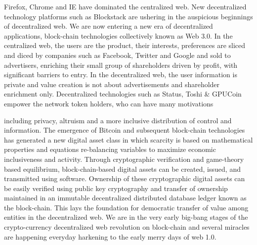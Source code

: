 \documentclass{article}
\begin{document}
Firefox, Chrome and IE have dominated the centralized web. New decentralized technology platforms such as Blockstack are ushering in the auspicious beginnings of decentralized web. 
We are now entering a new era of decentralized applications, block-chain technologies collectively known as Web 3.0. In the centralized web, the users are the product, their interests, preferences are sliced and diced by companies such as Facebook, Twitter and Google and sold to advertisers, enriching their small group of shareholders driven by profit, with significant barriers to entry. In the
decentralized web, the user information is private and value creation is not about advertisements and shareholder enrichment only. Decentralized
technologies such as Status, Toshi \& GPUCoin empower the network token holders, who can have many motivations 

 including privacy, altruism and a more inclusive distribution of control and information. The emergence of Bitcoin and subsequent block-chain technologies has generated a new digital asset class in which scarcity is based on mathematical properties and equations re-balancing variables to maximize economic inclusiveness and activity. Through cryptographic verification and game-theory based equilibrium, block-chain-based digital assets can be created, issued, and transmitted using software. Ownership of these cryptographic digital assets can be easily verified using public key cryptography and transfer of ownership maintained in an immutable decentralized distributed database ledger known as the block-chain. This lays the foundation for democratic transfer of value among entities in the decentralized web.
We are in the very early big-bang stages of the crypto-currency decentralized web revolution on block-chain and several miracles are happening everyday harkening to the early merry days of web 1.0.
\end{document}
